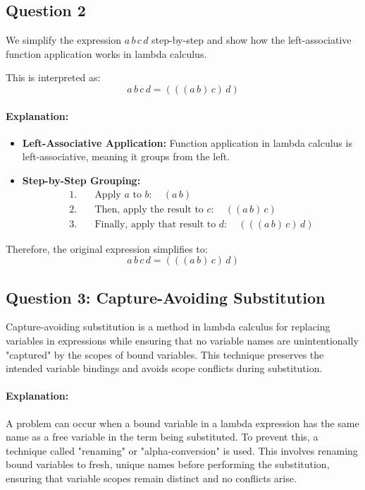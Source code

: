\documentclass{article}
\theoremstyle{theorem}
\theoremstyle{definition}
\theoremstyle{remark}
\begin{document}
{\subsection*{Question 2}
We simplify the expression \( a \, b \, c \, d \) step-by-step and show how the left-associative function application works in lambda calculus.

This is interpreted as:
\[
a \, b \, c \, d = (((a \, b) \, c) \, d)
\]

\paragraph{Explanation:}
\begin{itemize}
    \item \textbf{Left-Associative Application:} Function application in lambda calculus is left-associative, meaning it groups from the left.
    \item \textbf{Step-by-Step Grouping:}
    \begin{align*}
        1. & \quad \text{Apply } a \text{ to } b: \quad (a \, b) \\
        2. & \quad \text{Then, apply the result to } c: \quad ((a \, b) \, c) \\
        3. & \quad \text{Finally, apply that result to } d: \quad (((a \, b) \, c) \, d)
    \end{align*}
\end{itemize}

Therefore, the original expression simplifies to:
\[
a \, b \, c \, d = (((a \, b) \, c) \, d)
\]

\subsection*{Question 3: Capture-Avoiding Substitution}
Capture-avoiding substitution is a method in lambda calculus for replacing variables in expressions while ensuring that no variable names are unintentionally "captured" by the scopes of bound variables. This technique preserves the intended variable bindings and avoids scope conflicts during substitution.

\paragraph{Explanation:}
A problem can occur when a bound variable in a lambda expression has the same name as a free variable in the term being substituted. To prevent this, a technique called "renaming" or "alpha-conversion" is used. This involves renaming bound variables to fresh, unique names before performing the substitution, ensuring that variable scopes remain distinct and no conflicts arise.

}
\end{document}

